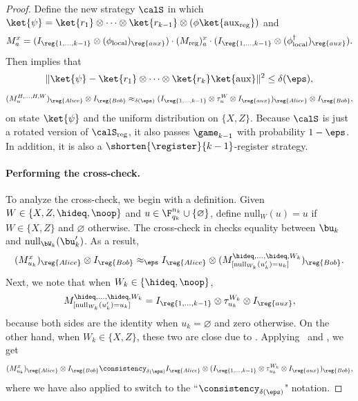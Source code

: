 \begin{proof}
Define the new strategy $\calS$ in which $\ket{\psi} = \ket{r_1} \otimes \cdots \otimes \ket{r_{k-1}} \otimes (\phi \ket{\mathrm{aux}_{\mathrm{reg}}})$
and 
\begin{equation*}
M^x_a = (I_{\reg{1, \ldots, k-1}} \otimes (\phi_{\mathrm{local}})_{\reg{aux}})
	\cdot (M_{\mathrm{reg}})^x_a
		\cdot (I_{\reg{1, \ldots, k-1}} \otimes (\phi^\dagger_{\mathrm{local}})_{\reg{aux}}).
\end{equation*}
Then  implies that
\begin{equation}\label{eq:applied-the-fact-again}
\Vert  \ket{\psi} - \ket{r_1}\otimes \cdots \otimes \ket{r_k} \ket{\mathrm{aux}} \Vert^2 \leq \delta(\eps),
\end{equation}
\begin{equation}\label{eq:applied-the-fact-again-dos}
(M^{H, \ldots, H, W}_u)_{\reg{Alice}} \otimes I_{\reg{Bob}}
\approx_{\delta(\eps)}
(I_{\reg{1, \ldots, k-1}} \otimes \tau_{u}^{W} \otimes I_{\reg{aux}})_{\reg{Alice}} \otimes I_{\reg{Bob}},
\end{equation}
on state $\ket{\psi}$ and the uniform distribution on $\{X,Z\}$.
Because $\calS$ is just a rotated version of $\calS_{\mathrm{reg}}$,
it also passes  $\game_{k-1}$ with probability $1-\eps$.
In addition, it is also a $\shorten{\register}{k-1}$-register strategy.

\paragraph{Performing the cross-check.}
To analyze the cross-check, we begin with a definition.
Given $W \in \{X, Z, \hideq, \noop\}$
and $u \in \F_{q_k}^{n_k} \cup \{\varnothing\}$, define
$\mathrm{null}_{W}(u) = u$ if $W \in \{X, Z\}$ and $\varnothing$ otherwise.
The cross-check in  checks equality between
$\bu_k$ and $\mathrm{null}_{\bW_k}(\bu_k')$.
As a result,
\begin{equation*}
(M^x_{u_k})_{\reg{Alice}} \otimes I_{\reg{Bob}}
\approx_{\eps} I_{\reg{Alice}} \otimes (M^{\hideq, \ldots, \hideq, W_k}_{[\mathrm{null}_{W_k}(u_k') = u_k]})_{\reg{Bob}}.
\end{equation*}
Next, we note that when $W_k \in \{\hideq, \noop\}$,
\begin{equation*}
M^{\hideq, \ldots, \hideq, W_k}_{[\mathrm{null}_{W_k}(u_k') = u_k]}
= I_{\reg{1, \ldots, k-1}} \otimes \tau^{W_k}_{u_k} \otimes I_{\reg{aux}},
\end{equation*}
because both sides are the identity when $u_k = \varnothing$ and zero otherwise.
On the other hand, when $W_k \in \{X, Z\}$, these two are close due to .
Applying~ and , we get
\begin{equation}\label{eq:looks-like-tau}
(M^x_{u_k})_{\reg{Alice}} \otimes I _{\reg{Bob}}
\consistency_{\delta(\eps)} I_{\reg{Alice}} \otimes (I_{\reg{1, \ldots, k-1}} \otimes \tau^{W_k}_{u_k} \otimes I_{\reg{aux}})_{\reg{Bob}},
\end{equation}
where we have also applied  to switch to the ``$\consistency_{\delta(\eps)}$" notation.


\end{proof}
